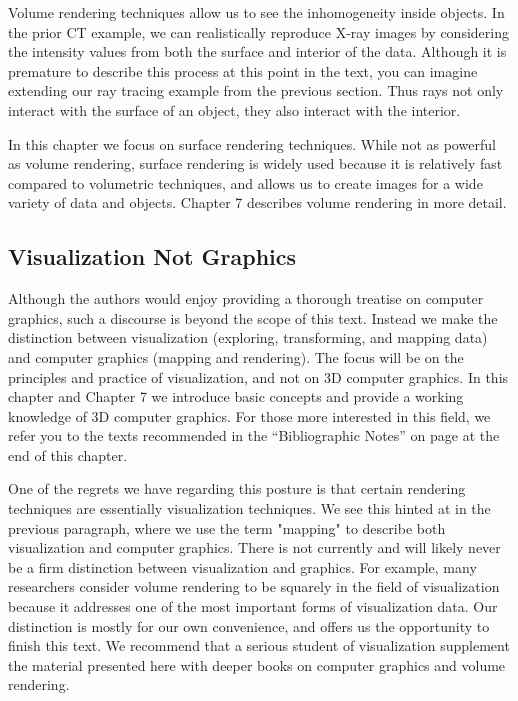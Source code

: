 Volume rendering techniques allow us to see the inhomogeneity inside objects. In the prior CT example, we can realistically reproduce X-ray images by considering the intensity values from both the surface and interior of the data. Although it is premature to describe this process at this point in the text, you can imagine extending our ray tracing example from the previous section. Thus rays not only interact with the surface of an object, they also interact with the interior.

In this chapter we focus on surface rendering techniques. While not as powerful as volume rendering, surface rendering is widely used because it is relatively fast compared to volumetric techniques, and allows us to create images for a wide variety of data and objects. Chapter 7 describes volume rendering in more detail.

\subsection{Visualization Not Graphics}

Although the authors would enjoy providing a thorough treatise on computer graphics, such a discourse is beyond the scope of this text. Instead we make the distinction between visualization (exploring, transforming, and mapping data) and computer graphics (mapping and rendering). The focus will be on the principles and practice of visualization, and not on 3D computer graphics. In this chapter and Chapter 7 we introduce basic concepts and provide a working knowledge of 3D computer graphics. For those more interested in this field, we refer you to the texts recommended in the ``Bibliographic Notes'' on page \pageref{Ch03BibNotes} at the end of this chapter.

One of the regrets we have regarding this posture is that certain rendering techniques are essentially visualization techniques. We see this hinted at in the previous paragraph, where we use the term "mapping" to describe both visualization and computer graphics. There is not currently and will likely never be a firm distinction between visualization and graphics. For example, many researchers consider volume rendering to be squarely in the field of visualization because it addresses one of the most important forms of visualization data. Our distinction is mostly for our own convenience, and offers us the opportunity to finish this text. We recommend that a serious student of visualization supplement the material presented here with deeper books on computer graphics and volume rendering.

